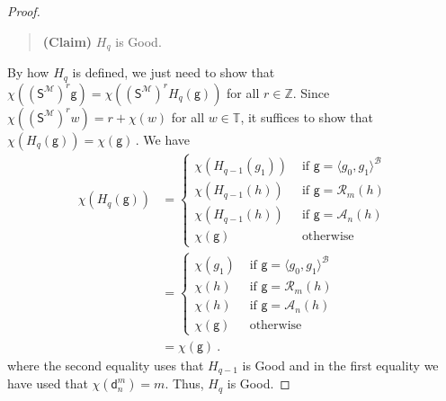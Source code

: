 \documentclass[10pt,a4paper, openany,  oldfontcommands]{memoir}
\newtheorem{open problem} [theorem] {Open Problem}
\newtheorem{open question} [theorem] {Open Question}
\renewcommand{\mathrm}{\mathsf}
\begin{document}
\begin{proof}
   \begin{quote} {\bf (Claim)} \;\;\;\;\;\;    
$  H_q  $   is  \textsf{Good}.
 \end{quote}  
 
 
 
 By how   $  H_q  $   is defined,    we just need to show that    
 $  \chi   \left(      \left(   \mathrm{S}^{  \mathcal{M}  }  \right)^r   \mathsf{g}     \right)     =  
 \chi   \left(      \left(   \mathrm{S}^{  \mathcal{M}  }  \right)^r       H_q   \left( \mathsf{g}    \right)   \right)     $  for  all  $  r  \in  \mathbb{Z} $. 
 Since    $     \chi   \left(      \left(   \mathrm{S}^{  \mathcal{M}  }  \right)^r   w   \right)    =  r  +  \chi (w)  $  for all $  w  \in \mathbb{T} $, 
 it suffices to show that  
 $  \chi   \left(     H_q   \left( \mathsf{g}    \right)   \right)    =   \chi   \left(    \mathsf{g}  \right)       \,   $.
We have  
\begin{align*}
 \chi   \left(     H_q   \left( \mathsf{g}    \right)   \right)      
 &=  \begin{cases}
 \chi   \left(      H_{ q-1} ( g_1 )   \right) 
         &   \mbox{ if  }   \mathsf{g}   = \langle  g_0   ,      g_1   \rangle^{  \mathcal{B}  }  
 \\
 \chi   \left(      H_{ q-1} ( h )   \right) 
           &   \mbox{ if  }   \mathsf{g}   =  \mathcal{R}_m  \left(  h     \right) 
 \\
 \chi   \left(      H_{ q-1} ( h  )   \right) 
         &   \mbox{ if  }   \mathsf{g}   =  \mathcal{A}_n  \left(  h     \right)  
 \\
  \chi   \left(    \mathsf{g}  \right)         &    \mbox{ otherwise }     
\end{cases}
\\
 &=  \begin{cases}
 \chi   \left(     g_1  \right) 
         &   \mbox{ if  }   \mathsf{g}   = \langle  g_0   ,      g_1   \rangle^{  \mathcal{B}  }  
 \\
 \chi   \left(   h \right) 
           &   \mbox{ if  }   \mathsf{g}   =  \mathcal{R}_m  \left(  h     \right) 
 \\
 \chi   \left(    h \right) 
         &   \mbox{ if  }   \mathsf{g}   =  \mathcal{A}_n  \left(  h     \right)  
 \\
  \chi   \left(    \mathsf{g}  \right)         &    \mbox{ otherwise }     
\end{cases}
\\
&=   \chi  \left(  \mathsf{g}  \right)  
\        . 
\end{align*}
  where the second  equality uses that  $  H_{ q-1}  $  is \textsf{Good}  and  in the first equality we have used that  $  \chi \left(  \mathsf{d}^m_n  \right)  =  m  $. 
 Thus,  $  H_q  $  is  \textsf{Good.}
 

\end{proof}
\end{document}
